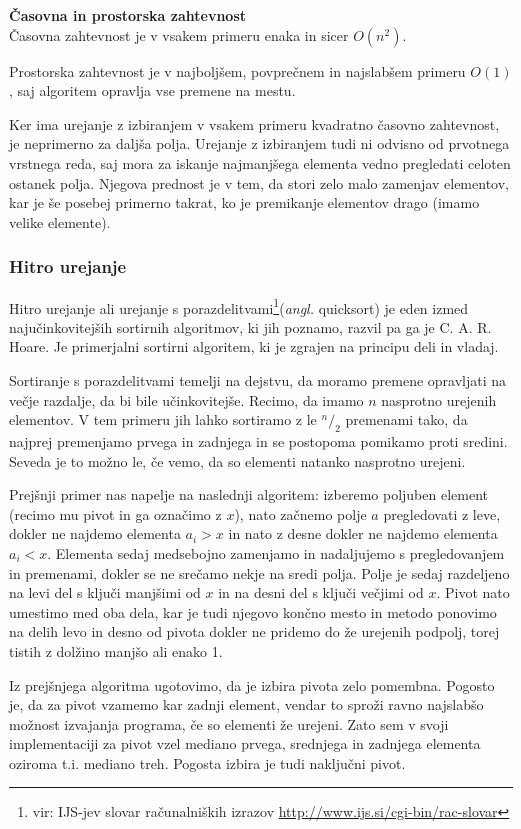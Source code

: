 \documentclass[a4paper,oneside,10pt]{article}
\newcommand{\subsubsubsection}[1]{\vspace*{1ex}\textbf{#1}\\}
\begin{document}
\subsubsubsection{Časovna in prostorska zahtevnost}
Časovna zahtevnost je v vsakem primeru enaka in sicer $O(n^2)$.

Prostorska zahtevnost je v najboljšem, povprečnem in najslabšem primeru $O(1)$, 
saj algoritem opravlja vse premene na mestu.

Ker ima urejanje z izbiranjem v vsakem primeru kvadratno časovno zahtevnost, je neprimerno
za daljša polja. Urejanje z izbiranjem tudi ni odvisno od prvotnega vrstnega reda,
saj mora za iskanje najmanjšega elementa vedno pregledati celoten ostanek polja.
Njegova prednost je v tem, da stori zelo malo zamenjav elementov, kar je še posebej
primerno takrat, ko je premikanje elementov drago (imamo velike elemente).

\subsubsection{Hitro urejanje}
\label{chapter:quicksort}
Hitro urejanje ali urejanje s porazdelitvami\footnote{vir: IJS-jev slovar računalniških izrazov
\url{http://www.ijs.si/cgi-bin/rac-slovar}}(\emph{angl.} quicksort) je eden izmed
najučinkovitejših sortirnih algoritmov, ki jih poznamo, razvil pa ga je C. A. R. Hoare.
Je primerjalni sortirni algoritem, ki je zgrajen na principu deli in vladaj.

Sortiranje s porazdelitvami temelji na dejstvu, da moramo premene opravljati na večje
razdalje, da bi bile učinkovitejše. Recimo, da imamo $n$ nasprotno urejenih elementov.
V tem primeru jih lahko sortiramo z le $^n/_2$ premenami tako, da najprej premenjamo prvega
in zadnjega in se postopoma pomikamo proti sredini. Seveda je to možno le, če vemo, da so 
elementi natanko nasprotno urejeni.

Prejšnji primer nas napelje na naslednji algoritem: 
izberemo poljuben element (recimo mu pivot in ga označimo z $x$), nato začnemo 
polje $a$ pregledovati z leve, dokler ne najdemo elementa $a_i > x$ in nato z desne dokler ne 
najdemo elementa $a_i < x$. Elementa sedaj medsebojno zamenjamo in nadaljujemo s 
pregledovanjem in premenami, dokler se ne srečamo nekje na sredi polja.
Polje je sedaj razdeljeno na levi del s ključi manjšimi od $x$ in na desni del
s ključi večjimi od $x$. Pivot nato umestimo med oba dela, kar je tudi njegovo končno
mesto in metodo ponovimo na delih levo in desno od pivota dokler ne pridemo do že urejenih
podpolj, torej tistih z dolžino manjšo ali enako 1. 

Iz prejšnjega algoritma ugotovimo, da je izbira pivota zelo
pomembna. Pogosto je, da za pivot vzamemo kar zadnji element, vendar to sproži ravno
najslabšo možnost izvajanja programa, če so elementi že urejeni. Zato sem v svoji
implementaciji za pivot vzel mediano prvega, srednjega in zadnjega elementa oziroma t.i.
mediano treh. Pogosta izbira je tudi naključni pivot. 
\end{document}

